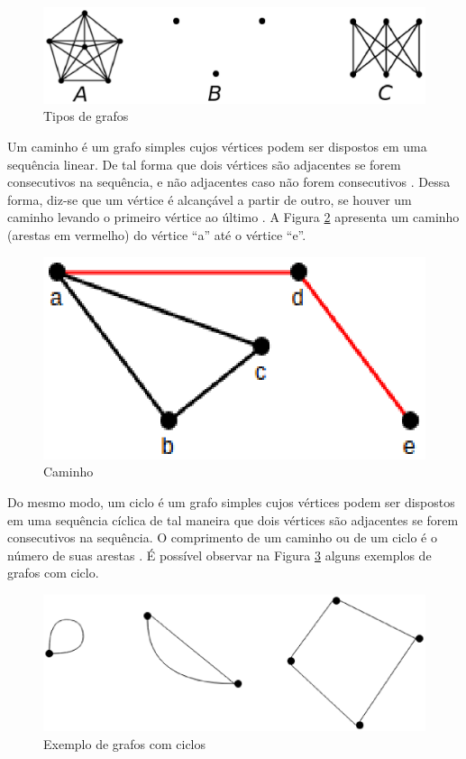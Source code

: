 \begin{figure}[!h]
	\centering
	\includegraphics[scale=0.4]{figuras/capitulo2/tipos_grafos.eps}
	\caption{Tipos de grafos}
	\label{tipos_grafos}
\end{figure}

Um caminho é um grafo simples cujos vértices podem ser dispostos em uma sequência linear. De tal forma que dois vértices são adjacentes se forem consecutivos na sequência, e não adjacentes caso não forem consecutivos \cite{Bondy:2007}. Dessa forma, diz-se que um vértice é alcançável a partir de outro, se houver um caminho levando o primeiro vértice ao último \cite{Costa:2011}. A Figura \ref{caminho} apresenta um caminho (arestas em vermelho) do vértice ``a'' até o vértice ``e''.

\begin{figure}[!h]
	\centering
	\includegraphics[scale=0.5]{figuras/capitulo2/caminho.eps}
	\caption{Caminho}
	\label{caminho}
\end{figure}

Do mesmo modo, um ciclo é um grafo simples cujos vértices podem ser dispostos em uma sequência cíclica de tal maneira que dois vértices são adjacentes se forem consecutivos na sequência. O comprimento de um caminho ou de um ciclo é o número de suas arestas \cite{Costa:2011}. É possível observar na Figura \ref{ciclos} alguns exemplos de grafos com ciclo.

\begin{figure}[!h]
	\centering
	\includegraphics[scale=0.3]{figuras/capitulo2/ciclos.eps}
	\caption{Exemplo de grafos com ciclos}
	\label{ciclos}
\end{figure}

